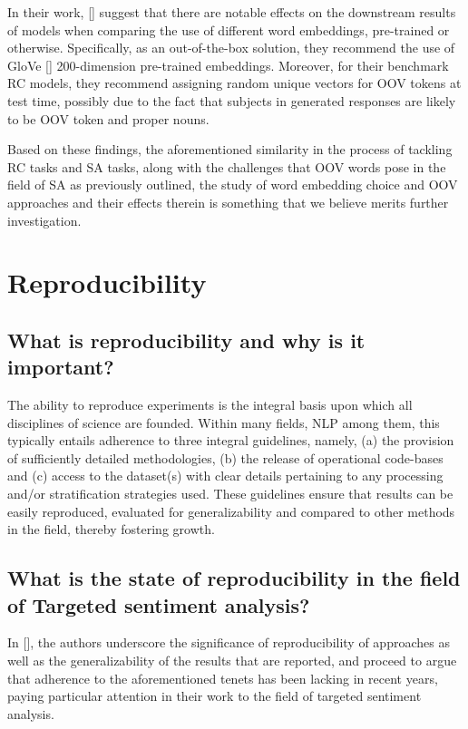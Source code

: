 \documentclass[12pt, a4paper]{report}
\theoremstyle{definition}
\theoremstyle{definition}%
\theoremstyle{definition}%
\theoremstyle{definition}%
\theoremstyle{definition}%
\theoremstyle{definition}%
\renewcommand{\cite}[1]{[\citealp{#1}]}
\begin{document}
In their work, \cite{bhuwandhingra2017} suggest that there are notable effects on the downstream results of models when comparing the use of different word embeddings, pre-trained or otherwise. Specifically, as an out-of-the-box solution, they recommend the use of GloVe \cite{pennington} 200-dimension pre-trained embeddings. Moreover, for their benchmark RC models, they recommend assigning random unique vectors for OOV tokens at test time, possibly due to the fact that subjects in generated responses are likely to be OOV token and proper nouns. 

Based on these findings, the aforementioned similarity in the process of tackling RC tasks and SA tasks, along with the challenges that OOV words pose in the field of SA as previously outlined, the study of word embedding choice and OOV approaches and their effects therein is something that we believe merits further investigation.  

\section{Reproducibility}
\subsection{What is reproducibility and why is it important?}
The ability to reproduce experiments is the integral basis upon which all disciplines of science are founded. Within many fields, NLP among them, this typically entails adherence to three integral guidelines, namely, (a) the provision of sufficiently detailed methodologies, (b) the release of operational code-bases and (c) access to the dataset(s) with clear details pertaining to any processing and/or stratification strategies used. These guidelines ensure that results can be easily reproduced, evaluated for generalizability and compared to other methods in the field, thereby fostering growth. 

\subsection{What is the state of reproducibility in the field of Targeted sentiment analysis?}
In \cite{moore2018}, the authors underscore the significance of reproducibility of approaches as well as the generalizability of the results that are reported, and proceed to argue that adherence to the aforementioned tenets has been lacking in recent years, paying particular attention in their work to the field of targeted sentiment analysis. 
\end{document}
